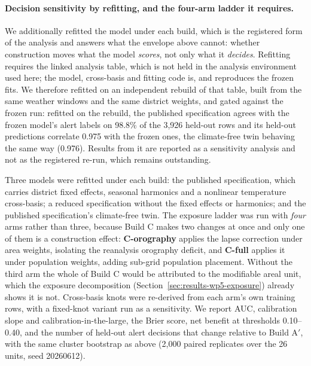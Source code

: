 \paragraph{Decision sensitivity by refitting, and the four-arm ladder it requires.}\REBUILD{} We additionally refitted the model under each build, which is the registered form of the analysis and answers what the envelope above cannot: whether construction moves what the model \emph{scores}, not only what it \emph{decides}. Refitting requires the linked analysis table, which is not held in the analysis environment used here; the model, cross-basis and fitting code is, and reproduces the frozen fits. We therefore refitted on an independent rebuild of that table, built from the same weather windows and the same district weights, and gated against the frozen run: refitted on the rebuild, the published specification agrees with the frozen model's alert labels on 98.8\% of the 3{,}926 held-out rows and its held-out predictions correlate 0.975 with the frozen ones, the climate-free twin behaving the same way (0.976).\label{par:rebuild} Results from it are reported as a sensitivity analysis and not as the registered re-run, which remains outstanding.

Three models were refitted under each build: the published specification, which carries district fixed effects, seasonal harmonics and a nonlinear temperature cross-basis; a reduced specification without the fixed effects or harmonics; and the published specification's climate-free twin. The exposure ladder was run with \emph{four} arms rather than three, because Build C makes two changes at once and only one of them is a construction effect: \textbf{C-orography} applies the lapse correction under area weights, isolating the reanalysis orography deficit, and \textbf{C-full} applies it under population weights, adding sub-grid population placement. Without the third arm the whole of Build C would be attributed to the modifiable areal unit, which the exposure decomposition (Section~\ref{sec:results-wp5-exposure}) already shows it is not. Cross-basis knots were re-derived from each arm's own training rows, with a fixed-knot variant run as a sensitivity. We report AUC, calibration slope and calibration-in-the-large, the Brier score, net benefit at thresholds 0.10--0.40, and the number of held-out alert decisions that change relative to Build A$'$, with the same cluster bootstrap as above (2{,}000 paired replicates over the 26 units, seed 20260612).

